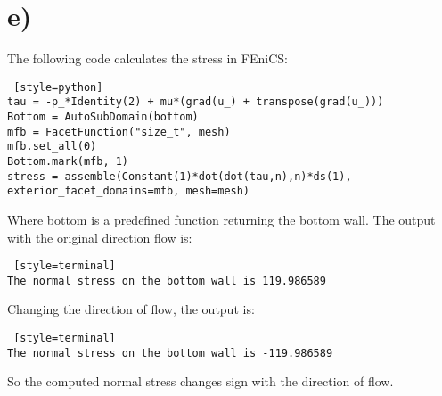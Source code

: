 \documentclass[a4paper,english,11pt,twoside]{article}
\begin{document}
\section*{e)}
The following code calculates the stress in FEniCS:
\begin{lstlisting} [style=python]
tau = -p_*Identity(2) + mu*(grad(u_) + transpose(grad(u_)))
Bottom = AutoSubDomain(bottom)
mfb = FacetFunction("size_t", mesh)
mfb.set_all(0)
Bottom.mark(mfb, 1)
stress = assemble(Constant(1)*dot(dot(tau,n),n)*ds(1), 
exterior_facet_domains=mfb, mesh=mesh)
\end{lstlisting}
Where bottom is a predefined function returning the bottom wall. The output with the original direction flow is:
\begin{lstlisting} [style=terminal]
The normal stress on the bottom wall is 119.986589
\end{lstlisting}
Changing the direction of flow, the output is:
\begin{lstlisting} [style=terminal]
The normal stress on the bottom wall is -119.986589
\end{lstlisting}
So the computed normal stress changes sign with the direction of flow.\\
 
\end{document}
